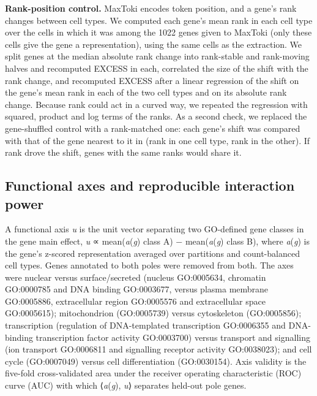 \documentclass[
  11pt,
]{article}
\begin{document}
\textbf{Rank-position control.} MaxToki encodes token position, and a
gene's rank changes between cell types. We computed each gene's mean
rank in each cell type over the cells in which it was among the 1022
genes given to MaxToki (only these cells give the gene a
representation), using the same cells as the extraction. We split genes
at the median absolute rank change into rank-stable and rank-moving
halves and recomputed EXCESS in each, correlated the size of the shift
with the rank change, and recomputed EXCESS after a linear regression of
the shift on the gene's mean rank in each of the two cell types and on
its absolute rank change. Because rank could act in a curved way, we
repeated the regression with squared, product and log terms of the
ranks. As a second check, we replaced the gene-shuffled control with a
rank-matched one: each gene's shift was compared with that of the gene
nearest to it in (rank in one cell type, rank in the other). If rank
drove the shift, genes with the same ranks would share it.

\subsection{Functional axes and reproducible interaction
power}\label{functional-axes-and-reproducible-interaction-power}

A functional axis \emph{u} is the unit vector separating two GO-defined
gene classes in the gene main effect, \emph{u} ∝ mean(\emph{a}(\emph{g})
\textbar{} class A) − mean(\emph{a}(\emph{g}) \textbar{} class B), where
\emph{a}(\emph{g}) is the gene's z-scored representation averaged over
partitions and count-balanced cell types. Genes annotated to both poles
were removed from both. The axes were nuclear versus surface/secreted
(nucleus GO:0005634, chromatin GO:0000785 and DNA binding GO:0003677,
versus plasma membrane GO:0005886, extracellular region GO:0005576 and
extracellular space GO:0005615); mitochondrion (GO:0005739) versus
cytoskeleton (GO:0005856); transcription (regulation of DNA-templated
transcription GO:0006355 and DNA-binding transcription factor activity
GO:0003700) versus transport and signalling (ion transport GO:0006811
and signalling receptor activity GO:0038023); and cell cycle
(GO:0007049) versus cell differentiation (GO:0030154). Axis validity is
the five-fold cross-validated area under the receiver operating
characteristic (ROC) curve (AUC) with which ⟨\emph{a}(\emph{g}),
\emph{u}⟩ separates held-out pole genes.
\end{document}
